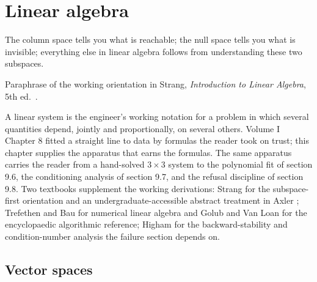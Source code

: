 \chapter{Linear algebra}
\label{vol02:ch09}


\epigraph{The column space tells you what is reachable; the null space
tells you what is invisible; everything else in linear algebra
follows from understanding these two subspaces.}{Paraphrase of
the working orientation in Strang, \emph{Introduction to Linear
Algebra}, 5th ed.\ \cite[ch.~3]{text:strang2016}.}


\noindent
A linear system is the engineer's working notation for a problem in
which several quantities depend, jointly and proportionally, on
several others. Volume I Chapter 8 fitted a straight line to data by
formulas the reader took on trust; this chapter supplies the
apparatus that earns the formulas. The same apparatus carries the
reader from a hand-solved $3 \times 3$ system to the polynomial fit
of section 9.6, the conditioning analysis of section 9.7, and the
refusal discipline of section 9.8. Two textbooks supplement the
working derivations: Strang \cite{text:strang2016} for the
subspace-first orientation and an undergraduate-accessible
abstract treatment in Axler \cite{text:v2ch09-axler2015}; Trefethen
and Bau \cite{text:trefethen-bau1997} for numerical linear algebra
and Golub and Van Loan \cite{text:v2ch09-golub-vanloan2013} for the
encyclopaedic algorithmic reference; Higham
\cite{text:v2ch09-higham2002} for the backward-stability and
condition-number analysis the failure section depends on.

\section{Vector spaces}


